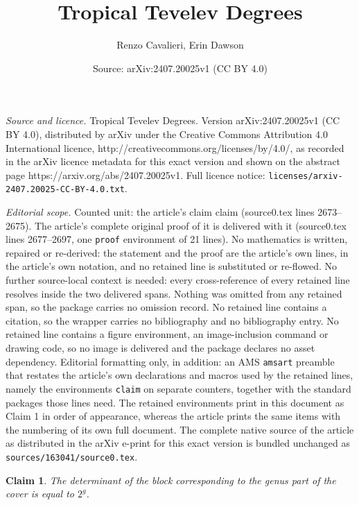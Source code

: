 \documentclass[10pt,a4paper]{amsart}
\title{Tropical Tevelev Degrees}
\author{Renzo Cavalieri, Erin Dawson}
\date{Source: arXiv:2407.20025v1 (CC BY 4.0)}
\newtheorem{claim}{Claim}
\begin{document}
\maketitle

\noindent\emph{Source and licence.} Tropical Tevelev Degrees. Version arXiv:2407.20025v1 (CC BY 4.0), distributed by arXiv under the Creative Commons Attribution 4.0 International licence, http://creativecommons.org/licenses/by/4.0/, as recorded in the arXiv licence metadata for this exact version and shown on the abstract page https://arxiv.org/abs/2407.20025v1. Full licence notice: \texttt{licenses/arxiv-2407.20025-CC-BY-4.0.txt}.\par\smallskip

\noindent\textit{Editorial scope.} Counted unit: the article's claim claim (source0.tex lines 2673--2675). The article's complete original proof of it is delivered with it (source0.tex lines 2677--2697, one \texttt{proof} environment of 21 lines). No mathematics is written, repaired or re-derived: the statement and the proof are the article's own lines, in the article's own notation, and no retained line is substituted or re-flowed.  No further source-local context is needed: every cross-reference of every retained line resolves inside the two delivered spans.  Nothing was omitted from any retained span, so the package carries no omission record.  No retained line contains a citation, so the wrapper carries no bibliography and no bibliography entry.  No retained line contains a figure environment, an image-inclusion command or drawing code, so no image is delivered and the package declares no asset dependency.  Editorial formatting only, in addition: an AMS \texttt{amsart} preamble that restates the article's own declarations and macros used by the retained lines, namely the environments \texttt{claim} on separate counters, together with the standard packages those lines need.  The retained environments print in this document as Claim 1 in order of appearance, whereas the article prints the same items with the numbering of its own full document.  The complete native source of the article as distributed in the arXiv e-print for this exact version is bundled unchanged as \texttt{sources/163041/source0.tex}.
\begin{claim}
    The determinant of the block corresponding to the genus part of the cover is equal to $2^g$. 
\end{claim}
\end{document}
